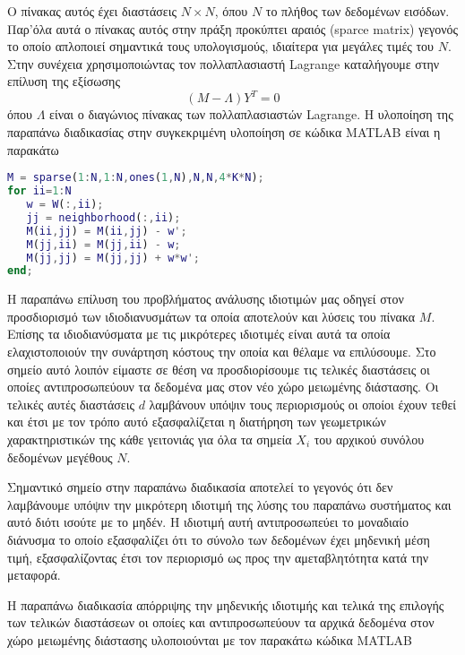 Ο πίνακας αυτός έχει διαστάσεις $N \times N$, όπου $N$ το πλήθος των δεδομένων εισόδων. Παρ'όλα αυτά ο πίνακας αυτός στην πράξη προκύπτει αραιός \textlatin{(sparce matrix)} γεγονός το οποίο απλοποιεί σημαντικά τους υπολογισμούς, ιδιαίτερα για μεγάλες τιμές του $N$. Στην συνέχεια χρησιμοποιώντας τον πολλαπλασιαστή \textlatin{Lagrange} καταλήγουμε στην επίλυση της εξίσωσης
\begin{equation}
        (M-\Lambda)Y^{T} = 0
\end{equation}
\hspace*{\fill}\newline
όπου $\Lambda$ είναι ο διαγώνιος πίνακας των πολλαπλασιαστών \textlatin{Lagrange}. Η υλοποίηση της παραπάνω διαδικασίας στην συγκεκριμένη υλοποίηση σε κώδικα \textlatin{MATLAB} είναι η παρακάτω
\begin{lstlisting}[language=Matlab]
% M=eye(N,N); % use a sparse matrix with storage for 4KN nonzero elements
M = sparse(1:N,1:N,ones(1,N),N,N,4*K*N); 
for ii=1:N
   w = W(:,ii);
   jj = neighborhood(:,ii);
   M(ii,jj) = M(ii,jj) - w';
   M(jj,ii) = M(jj,ii) - w;
   M(jj,jj) = M(jj,jj) + w*w';
end;
\end{lstlisting}
\par
Η παραπάνω επίλυση του προβλήματος ανάλυσης ιδιοτιμών μας οδηγεί στον προσδιορισμό των ιδιοδιανυσμάτων τα οποία αποτελούν και λύσεις του πίνακα $M$. Επίσης τα ιδιοδιανύσματα με τις μικρότερες ιδιοτιμές είναι αυτά τα οποία ελαχιστοποιούν την συνάρτηση κόστους την οποία και θέλαμε να επιλύσουμε. Στο σημείο αυτό λοιπόν είμαστε σε θέση να προσδιορίσουμε τις τελικές διαστάσεις οι οποίες αντιπροσωπεύουν τα δεδομένα μας στον νέο χώρο μειωμένης διάστασης. Οι τελικές αυτές διαστάσεις $d$ λαμβάνουν υπόψιν τους περιορισμούς οι οποίοι έχουν τεθεί και έτσι με τον τρόπο αυτό εξασφαλίζεται η διατήρηση των γεωμετρικών χαρακτηριστικών της κάθε γειτονιάς για όλα τα σημεία $X_{i}$ του αρχικού συνόλου δεδομένων μεγέθους $N$. 
\par
Σημαντικό σημείο στην παραπάνω διαδικασία αποτελεί το γεγονός ότι δεν λαμβάνουμε υπόψιν την μικρότερη ιδιοτιμή της λύσης του παραπάνω συστήματος και αυτό διότι ισούτε με το μηδέν. Η ιδιοτιμή αυτή αντιπροσωπεύει το μοναδιαίο διάνυσμα το οποίο εξασφαλίζει ότι το σύνολο των δεδομένων έχει μηδενική μέση τιμή, εξασφαλίζοντας έτσι τον περιορισμό ως προς την αμεταβλητότητα κατά την μεταφορά.
\par
Η παραπάνω διαδικασία απόρριψης την μηδενικής ιδιοτιμής και τελικά της επιλογής των τελικών διαστάσεων οι οποίες και αντιπροσωπεύουν τα αρχικά δεδομένα στον χώρο μειωμένης διάστασης υλοποιούνται με τον παρακάτω κώδικα \textlatin{MATLAB}
